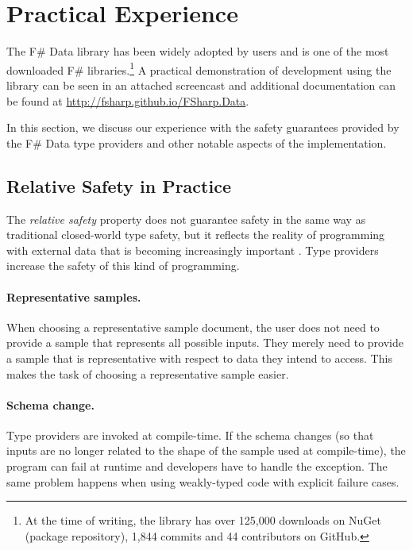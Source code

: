 \documentclass[pldi-cameraready]{sigplanconf-pldi16}
\begin{document}
\section{Practical Experience}
\label{sec:impl}

The F\# Data library has been widely adopted by users and is one of the most downloaded
F\# libraries.\footnote{At the time of writing, the library has over 125,000 downloads on NuGet
(package repository), 1,844 commits and 44 contributors on GitHub.} A practical demonstration of
development using the library can be seen in an attached screencast and additional documentation can be
found at \url{http://fsharp.github.io/FSharp.Data}.

In this section, we discuss our experience with the safety guarantees provided by the
F\# Data type providers and other notable aspects of the implementation.

\subsection{Relative Safety in Practice}
\label{sec:safety-discuss}

The \emph{relative safety} property does not guarantee safety in the same way as traditional
closed-world type safety, but it reflects the reality of programming with external data that is
becoming increasingly important \cite{age-of-web}. Type providers increase the safety of this kind of
programming.

\paragraph{Representative samples.}
When choosing a representative sample document, the user does not need to provide a sample
that represents all possible inputs. They merely need to provide a sample that is representative
with respect to data they intend to access. This makes the task of choosing a representative
sample easier.

\paragraph{Schema change.}
Type providers are invoked at compile-time. If the schema changes (so that inputs are no longer
related to the shape of the sample used at compile-time), the program can fail at runtime and
developers have to handle the exception. The same problem happens when using weakly-typed code
with explicit failure cases.
\end{document}
